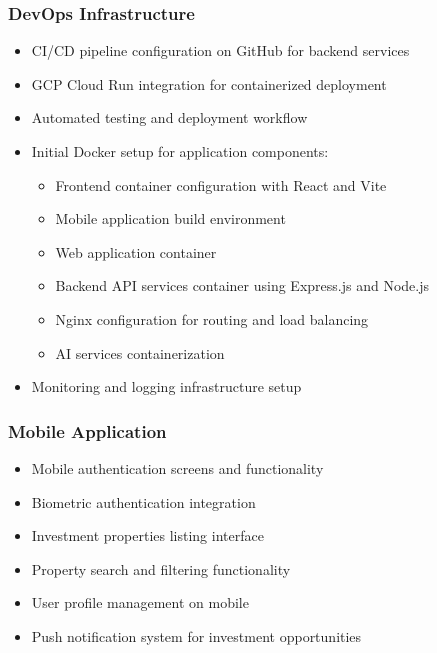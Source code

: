 \subsubsection{DevOps Infrastructure}
\begin{itemize}
    \item CI/CD pipeline configuration on GitHub \cite{GithubWebsite} for backend services
    \item GCP Cloud Run integration for containerized deployment
    \item Automated testing and deployment workflow
    \item Initial Docker setup for application components:
        \begin{itemize}
            \item Frontend container configuration with React \cite{ReactWebsite} and Vite \cite{ViteJSWebsite}
            \item Mobile application build environment
            \item Web application container
            \item Backend API services container using Express.js \cite{ExpressJSWebsite} and Node.js \cite{NodeJSWebsite}
            \item Nginx configuration for routing and load balancing
            \item AI services containerization
        \end{itemize}
    \item Monitoring and logging infrastructure setup
\end{itemize}

\subsubsection{Mobile Application}
\begin{itemize}
    \item Mobile authentication screens and functionality
    \item Biometric authentication integration
    \item Investment properties listing interface
    \item Property search and filtering functionality
    \item User profile management on mobile
    \item Push notification system for investment opportunities
\end{itemize}

